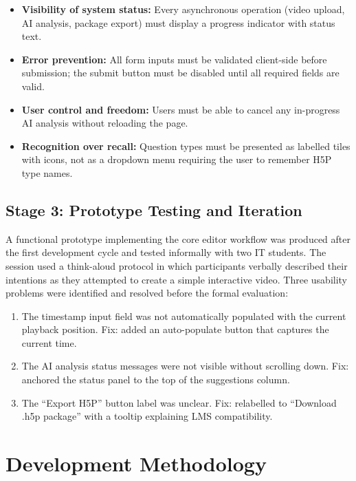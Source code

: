 \begin{itemize}
  \item \textbf{Visibility of system status:} Every asynchronous operation
  (video upload, AI analysis, package export) must display a progress
  indicator with status text.
  \item \textbf{Error prevention:} All form inputs must be validated
  client-side before submission; the submit button must be disabled until
  all required fields are valid.
  \item \textbf{User control and freedom:} Users must be able to cancel
  any in-progress AI analysis without reloading the page.
  \item \textbf{Recognition over recall:} Question types must be presented
  as labelled tiles with icons, not as a dropdown menu requiring the user
  to remember H5P type names.
\end{itemize}

\subsection{Stage 3: Prototype Testing and Iteration}

A functional prototype implementing the core editor workflow was produced
after the first development cycle and tested informally with two IT students.
The session used a think-aloud protocol in which participants verbally
described their intentions as they attempted to create a simple interactive
video. Three usability problems were identified and resolved before the
formal evaluation:

\begin{enumerate}
  \item The timestamp input field was not automatically populated with the
  current playback position. Fix: added an auto-populate button that captures
  the current time.
  \item The AI analysis status messages were not visible without scrolling
  down. Fix: anchored the status panel to the top of the suggestions column.
  \item The ``Export H5P'' button label was unclear. Fix: relabelled to
  ``Download .h5p package'' with a tooltip explaining LMS compatibility.
\end{enumerate}

\section{Development Methodology}

